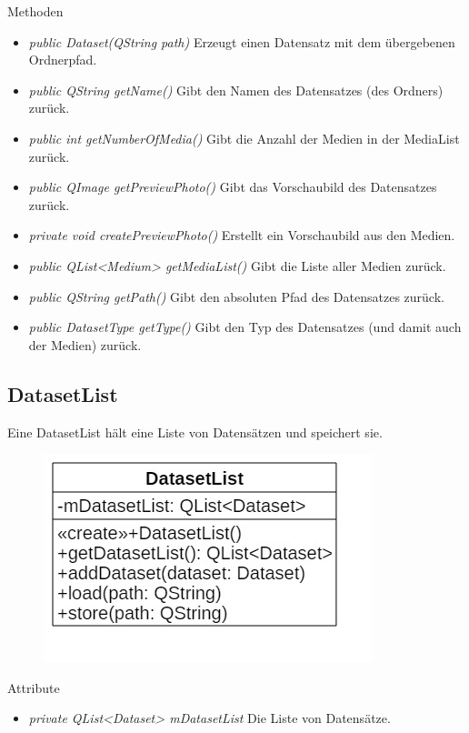 Methoden
\begin{itemize}
\item \textit{public Dataset(QString path)} Erzeugt einen Datensatz mit dem übergebenen Ordnerpfad.
\item \textit{public QString getName()} Gibt den Namen des Datensatzes (des Ordners) zurück.
\item \textit{public int getNumberOfMedia()} Gibt die Anzahl der Medien in der MediaList zurück.
\item \textit{public QImage getPreviewPhoto()} Gibt das Vorschaubild des Datensatzes zurück.
\item \textit{private void createPreviewPhoto()} Erstellt ein Vorschaubild aus den Medien.
\item \textit{public QList<Medium> getMediaList()} Gibt die Liste aller Medien zurück.
\item \textit{public QString getPath()} Gibt den absoluten Pfad des Datensatzes zurück.
\item \textit{public DatasetType getType()} Gibt den Typ des Datensatzes (und damit auch der Medien) zurück.
\end{itemize}

\subsection*{DatasetList}
Eine DatasetList hält eine Liste von Datensätzen und speichert sie.

\begin{figure}[H]
\centering
\includegraphics[scale=0.5]{img/Klassendiagramm/Klassen/DatasetList}
\label{fig:datasetList}
\end{figure}

Attribute
\begin{itemize}
\item\textit{private QList<Dataset> mDatasetList} Die Liste von Datensätze.
\end{itemize}

